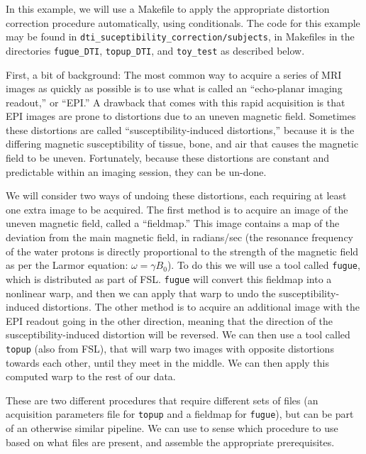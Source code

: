 \label{chap:dti}

In this example, we will use a Makefile to apply the appropriate
distortion correction procedure automatically, using conditionals. The
code for this example may be found in
\texttt{dti_suceptibility_correction/subjects}, in Makefiles in the
directories \texttt{fugue_DTI}, \texttt{topup_DTI}, and
\texttt{toy_test} as described below.

First, a bit of background: The most common way to acquire a series of
MRI images as quickly as possible is to use what is called an
``echo-planar imaging readout,'' or ``EPI.'' A drawback that comes
with this rapid acquisition is that EPI images are prone to
distortions due to an uneven magnetic field. Sometimes these
distortions are called ``susceptibility-induced distortions,'' because
it is the differing magnetic susceptibility of tissue, bone, and air
that causes the magnetic field to be uneven. Fortunately, because these
distortions are constant and predictable within an imaging session,
they can be un-done.

We will consider two ways of undoing these distortions, each requiring
at least one extra image to be acquired. The first method is to
acquire an image of the uneven magnetic field, called a ``fieldmap.''
This image contains a map of the deviation from the main magnetic
field, in radians/sec (the resonance frequency of the water protons is
directly proportional to the strength of the magnetic field as per the
Larmor equation: $\omega=\gamma B _{0}$). To do this we will use a
tool called \texttt{fugue}, which is distributed as part of
FSL. \texttt{fugue} will convert this fieldmap into a nonlinear warp,
and then we can apply that warp to undo the susceptibility-induced
distortions. The other method is to acquire an additional image with
the EPI readout going in the other direction, meaning that the
direction of the susceptibility-induced distortion will be
reversed. We can then use a tool called \texttt{topup} (also from
FSL), that will warp two images with opposite distortions towards each
other, until they meet in the middle. We can then apply this computed
warp to the rest of our data.


These are two different procedures that require different sets of
files (an acquisition parameters file for \texttt{topup} and a
fieldmap for \texttt{fugue}), but can be part of an otherwise similar
pipeline. We can use \maken{} to sense which procedure to use based on
what files are present, and assemble the appropriate prerequisites.


